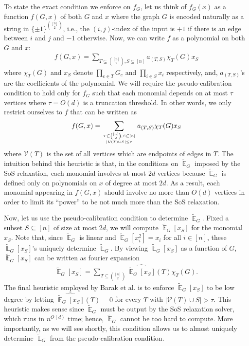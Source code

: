 \documentclass{article}[11pt]
\newcommand{\cV}{\mathcal{V}}
\newcommand{\E}{\mathop{\mathbb{E}}}
\newcommand{\tE}{\tilde{\E}}
\begin{document}
To state the exact condition we enforce on $f_G$, let us think of $f_G(x)$ as a function $f(G, x)$ of both $G$ and $x$ where the graph $G$ is encoded naturally as a string in $\{\pm 1\}^{[n] \choose 2}$, i.e., the $(i, j)$-index of the input is $+1$ if there is an edge between $i$ and $j$ and $-1$ otherwise. Now, we can write $f$ as a polynomial on both $G$ and $x$:
\begin{align*}
f(G, x) = \sum_{T \subseteq {[n] \choose 2}, S \subseteq [n]} a_{(T, S)} \chi_T(G) x_S
\end{align*}
where $\chi_T(G)$ and $x_S$ denote $\prod_{e \in T} G_e$ and $\prod_{i \in S} x_i$ respectively, and, $a_{(T, S)}$'s are the coefficients of the polynomial. We will require the pseudo-calibration condition to hold only for $f_G$ such that each monomial depends on at most $\tau$ vertices where $\tau = O(d)$ is a truncation threshold. In other words, we only restrict ourselves to $f$ that can be written as
\begin{align*}
f(G, x) = \sum_{T \subseteq {[n] \choose 2}, S \subseteq [n] \atop |\cV(T) \cup S| \leq \tau} a_{(T, S)} \chi_T(G) x_S
\end{align*}
where $\cV(T)$ is the set of all vertices which are endpoints of edges in $T$. The intuition behind this heuristic is that, in the conditions on $\tE_G$ imposed by the SoS relaxation, each monomial involves at most $2d$ vertices because $\tE_G$ is defined only on polynomials on $x$ of degree at most $2d$. As a result, each monomial appearing in $f(G, x)$ should involve no more than $O(d)$ vertices in order to limit its ``power'' to be not much more than the SoS relaxation.

Now, let us use the pseudo-calibration condition to determine $\tE_G$. Fixed a subset $S \subseteq [n]$ of size at most $2d$, we will compute $\tE_G[x_S]$ for the monomial $x_S$. Note that, since $\tE_G$ is linear and $\tE_G[x_i^2] = x_i$ for all $i \in [n]$, these $\tE_G[x_S]$'s uniquely determine $\tE_G$. By viewing $\tE_G[x_S]$ as a function of $G$, $\tE_G[x_S]$ can be written as fourier expansion
\begin{align*}
\tE_G[x_S] = \sum_{T \subseteq {[n] \choose 2}} \widehat{\tE_G[x_S]}(T) \chi_T(G).
\end{align*}
The final heuristic employed by Barak et al. is to enforce $\tE_G[x_S]$ to be low degree by letting $\widehat{\tE_G[x_S]}(T) = 0$ for every $T$ with $|\cV(T) \cup S| > \tau$. This heuristic makes sense since $\tE_G$ must be output by the SoS relaxation solver, which runs in $n^{O(d)}$ time; hence, $\tE_G$ cannot be too hard to compute. More importantly, as we will see shortly, this condition allows us to almost uniquely determine $\tE_G$ from the pseudo-calibration condition.
\end{document}
